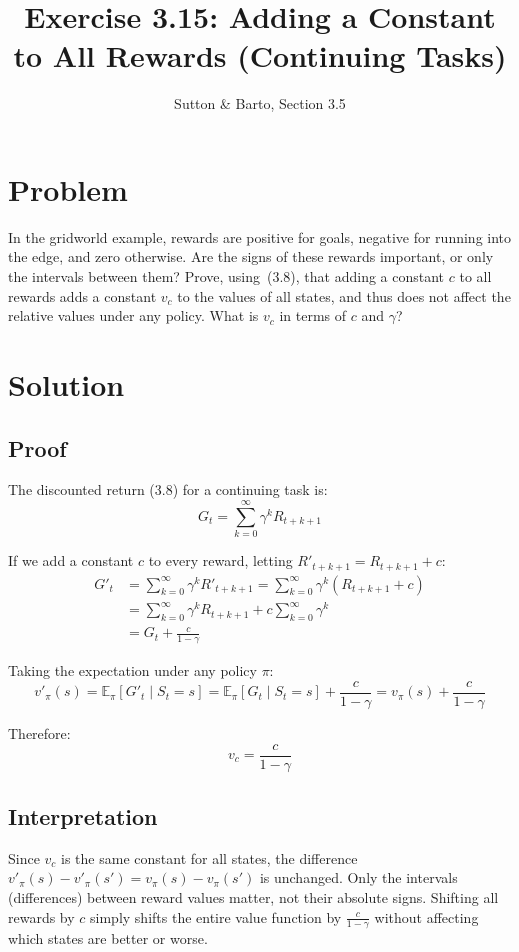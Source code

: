 \documentclass[11pt]{article}
\title{Exercise 3.15: Adding a Constant to All Rewards (Continuing Tasks)}
\author{Sutton \& Barto, Section 3.5}
\date{}
\begin{document}
\maketitle

\section*{Problem}

In the gridworld example, rewards are positive for goals, negative for running
into the edge, and zero otherwise. Are the signs of these rewards important, or
only the intervals between them? Prove, using~(3.8), that adding a constant $c$
to all rewards adds a constant $v_c$ to the values of all states, and thus does
not affect the relative values under any policy. What is $v_c$ in terms of $c$
and $\gamma$?

\section*{Solution}

\subsection*{Proof}

The discounted return (3.8) for a continuing task is:
\[
    G_t = \sum_{k=0}^{\infty} \gamma^k R_{t+k+1}
\]

If we add a constant $c$ to every reward, letting $R'_{t+k+1} = R_{t+k+1} + c$:
\begin{align*}
    G'_t &= \sum_{k=0}^{\infty} \gamma^k R'_{t+k+1}
         = \sum_{k=0}^{\infty} \gamma^k (R_{t+k+1} + c) \\[6pt]
         &= \sum_{k=0}^{\infty} \gamma^k R_{t+k+1}
          + c \sum_{k=0}^{\infty} \gamma^k \\[6pt]
         &= G_t + \frac{c}{1 - \gamma}
\end{align*}

Taking the expectation under any policy $\pi$:
\[
    v'_\pi(s) = \mathbb{E}_\pi[G'_t \mid S_t = s]
              = \mathbb{E}_\pi[G_t \mid S_t = s] + \frac{c}{1 - \gamma}
              = v_\pi(s) + \frac{c}{1 - \gamma}
\]

Therefore:
\[
    \boxed{v_c = \frac{c}{1 - \gamma}}
\]

\subsection*{Interpretation}

Since $v_c$ is the same constant for all states, the difference $v'_\pi(s) - v'_\pi(s')
= v_\pi(s) - v_\pi(s')$ is unchanged. Only the intervals (differences) between
reward values matter, not their absolute signs. Shifting all rewards by $c$ simply
shifts the entire value function by $\frac{c}{1-\gamma}$ without affecting which
states are better or worse.
\end{document}
